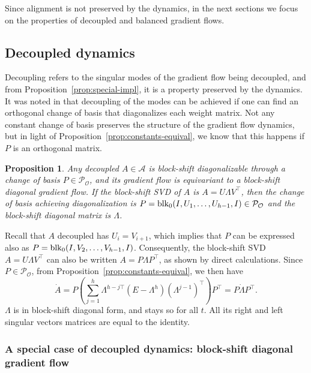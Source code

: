 \documentclass{article}
\makeatletter
\renewenvironment{proof}[1][\proofname]{
  \par\pushQED{\qed}\normalfont
  \topsep6\p@\@plus6\p@\relax
  \trivlist\item[\hskip\labelsep\bfseries#1\@addpunct{.}]
  \ignorespaces
}{
  \popQED\endtrivlist\@endpefalse
}
\newtheorem{proposition}{Proposition}
\def\block{{\rm blk}}
\newcommand{\1}{\mathds{1}}
\makeatother
\begin{document}
Since alignment is not preserved by the dynamics, in the next sections we focus on the properties of decoupled and balanced gradient flows.



\subsection{Decoupled dynamics}
\label{sec:decoup-dyn}
Decoupling refers to the singular modes of the gradient flow being decoupled, and from Proposition~\ref{prop:special-impl}, it is a property preserved by the dynamics. 
It was noted in \cite{saxe2013exact} that decoupling of the modes can be achieved if one can find an orthogonal change of basis that diagonalizes each weight matrix. Not any constant change of basis preserves the structure of the gradient flow dynamics, but in light of Proposition~\ref{prop:constants-equival}, we know that this happens if  $P $ is an orthogonal matrix. 


\begin{proposition}
\label{prop:decoupl-diag}
Any decoupled $ A \in \mathcal{A}$ is block-shift diagonalizable through a change of basis $ P \in \mathcal{P_O}$, and its gradient flow is equivariant to a block-shift diagonal gradient flow.
If the block-shift SVD of $A $ is $ A = U \Lambda V^\top $, then the change of basis achieving diagonalization is $ P = \block_0(I,U_1, \ldots, U_{h-1}, I) \in \mathcal{P_O}$ and the block-shift diagonal matrix is $ \Lambda$.
\end{proposition}
\begin{proof}
Recall that $ A$ decoupled has $ U_i=V_{i+1}$, which implies that $P$ can be expressed also as $ P = \block_0(I, V_2, \ldots, V_{h-1}, I) $. 
Consequently, the block-shift SVD $ A = U \Lambda V^\top $ can also be written $ A = P \Lambda P^\top $, as shown by direct calculations. 
Since $ P \in \mathcal{P_O}$, from Proposition~\ref{prop:constants-equival}, we then have 
\[
\dot{A} = P  \left( \sum_{j=1}^h  \Lambda^{h-j \top } (E - \Lambda^h ) (\Lambda^{j-1})^\top  \right) P^\top = P \dot \Lambda P^\top.
\]
$ \Lambda$ is in block-shift diagonal form, and stays so for all $ t$. All its right and left singular vectors matrices are equal to the identity.




\end{proof}



\subsubsection{A special case of decoupled dynamics: block-shift diagonal gradient flow}
\label{sec:diag-evol}
\end{document}
